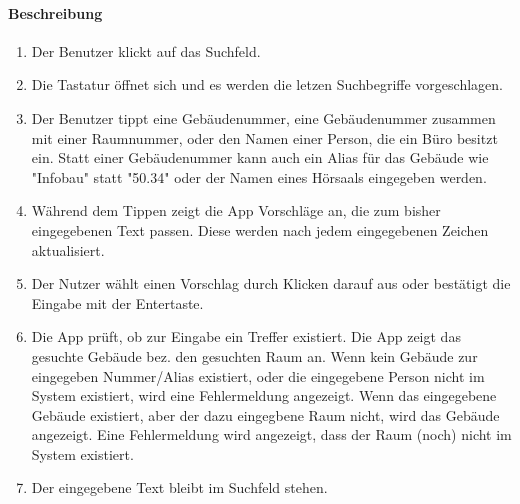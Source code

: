 \paragraph{Beschreibung}
\begin{enumerate}
    \item Der Benutzer klickt auf das Suchfeld.
    \item Die Tastatur öffnet sich und es werden die letzen Suchbegriffe vorgeschlagen.
    \item Der Benutzer tippt eine Gebäudenummer, eine Gebäudenummer zusammen mit einer Raumnummer, oder den Namen einer Person, die ein Büro besitzt ein. Statt einer Gebäudenummer kann auch ein Alias für das Gebäude wie "Infobau" statt "50.34" oder der Namen eines Hörsaals eingegeben werden.
    \item Während dem Tippen zeigt die App Vorschläge an, die zum bisher eingegebenen Text passen. Diese werden nach jedem eingegebenen Zeichen aktualisiert.
    \item Der Nutzer wählt einen Vorschlag durch Klicken darauf aus oder bestätigt die Eingabe mit der Entertaste.
    \item Die App prüft, ob zur Eingabe ein Treffer existiert.
     Die App zeigt das gesuchte Gebäude bez. den gesuchten Raum an.
    \subsubitem Wenn kein Gebäude zur eingegeben Nummer/Alias existiert, oder die eingegebene Person nicht im System existiert, wird eine Fehlermeldung angezeigt.
    \subsubitem Wenn das eingegebene Gebäude existiert, aber der dazu eingegbene Raum nicht, wird das Gebäude angezeigt. Eine Fehlermeldung wird angezeigt, dass der Raum (noch) nicht im System existiert.
    \item Der eingegebene Text bleibt im Suchfeld stehen.
\end{enumerate}